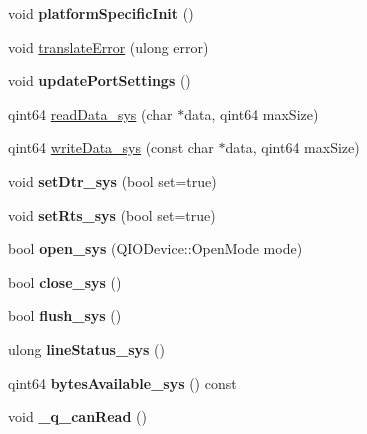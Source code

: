 \begin{DoxyCompactItemize}
\item 
\mbox{\label{classQextSerialPortPrivate_a073ce50d9be23dfc9dee51bde7f41e0b}} 
void {\bfseries platform\+Specific\+Init} ()
\item 
void \hyperlink{classQextSerialPortPrivate_af504151e61016c5e8a6d93378b834602}{translate\+Error} (ulong error)
\item 
\mbox{\label{classQextSerialPortPrivate_a93dbaf89172345288b00e936bc3ea87c}} 
void {\bfseries update\+Port\+Settings} ()
\item 
qint64 \hyperlink{classQextSerialPortPrivate_ab4a75579c479ccebb5f325af737a7045}{read\+Data\+\_\+sys} (char $\ast$data, qint64 max\+Size)
\item 
qint64 \hyperlink{classQextSerialPortPrivate_a54ad0646018e3a519582c81fd3631cc2}{write\+Data\+\_\+sys} (const char $\ast$data, qint64 max\+Size)
\item 
\mbox{\label{classQextSerialPortPrivate_af275a7dcc4a593d01b78e7997c4fb075}} 
void {\bfseries set\+Dtr\+\_\+sys} (bool set=true)
\item 
\mbox{\label{classQextSerialPortPrivate_aafb561e6173cd73470a8369af029dd36}} 
void {\bfseries set\+Rts\+\_\+sys} (bool set=true)
\item 
\mbox{\label{classQextSerialPortPrivate_aa0f8791cf7196d6544c6ab5fa7227c9e}} 
bool {\bfseries open\+\_\+sys} (Q\+I\+O\+Device\+::\+Open\+Mode mode)
\item 
\mbox{\label{classQextSerialPortPrivate_a7838ce80fb6a77d1e978b9839d97e9c0}} 
bool {\bfseries close\+\_\+sys} ()
\item 
\mbox{\label{classQextSerialPortPrivate_a237f7f6b7d1dbf43d83f4f747e2f577b}} 
bool {\bfseries flush\+\_\+sys} ()
\item 
\mbox{\label{classQextSerialPortPrivate_a62a36776b0d0ac6047f7f2ab911511e6}} 
ulong {\bfseries line\+Status\+\_\+sys} ()
\item 
\mbox{\label{classQextSerialPortPrivate_a74d7814b8a4226f832bc58a586aa51c4}} 
qint64 {\bfseries bytes\+Available\+\_\+sys} () const
\item 
\mbox{\label{classQextSerialPortPrivate_a55836e767da039d663fbdb70557f4b73}} 
void {\bfseries \+\_\+q\+\_\+can\+Read} ()
\end{DoxyCompactItemize}
